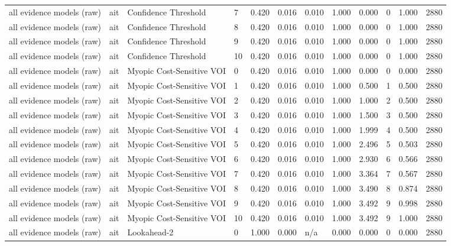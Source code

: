 \begin{table}[!ht]
{\begin{tabular}{llllllllllll}
all evidence models (raw) & ait & Confidence Threshold & 7 & 0.420 & 0.016 & 0.010 & 1.000 & 0.000 & 0 & 1.000 & 2880 \\
all evidence models (raw) & ait & Confidence Threshold & 8 & 0.420 & 0.016 & 0.010 & 1.000 & 0.000 & 0 & 1.000 & 2880 \\
all evidence models (raw) & ait & Confidence Threshold & 9 & 0.420 & 0.016 & 0.010 & 1.000 & 0.000 & 0 & 1.000 & 2880 \\
all evidence models (raw) & ait & Confidence Threshold & 10 & 0.420 & 0.016 & 0.010 & 1.000 & 0.000 & 0 & 1.000 & 2880 \\
all evidence models (raw) & ait & Myopic Cost-Sensitive VOI & 0 & 0.420 & 0.016 & 0.010 & 1.000 & 0.000 & 0 & 0.000 & 2880 \\
all evidence models (raw) & ait & Myopic Cost-Sensitive VOI & 1 & 0.420 & 0.016 & 0.010 & 1.000 & 0.500 & 1 & 0.500 & 2880 \\
all evidence models (raw) & ait & Myopic Cost-Sensitive VOI & 2 & 0.420 & 0.016 & 0.010 & 1.000 & 1.000 & 2 & 0.500 & 2880 \\
all evidence models (raw) & ait & Myopic Cost-Sensitive VOI & 3 & 0.420 & 0.016 & 0.010 & 1.000 & 1.500 & 3 & 0.500 & 2880 \\
all evidence models (raw) & ait & Myopic Cost-Sensitive VOI & 4 & 0.420 & 0.016 & 0.010 & 1.000 & 1.999 & 4 & 0.500 & 2880 \\
all evidence models (raw) & ait & Myopic Cost-Sensitive VOI & 5 & 0.420 & 0.016 & 0.010 & 1.000 & 2.496 & 5 & 0.503 & 2880 \\
all evidence models (raw) & ait & Myopic Cost-Sensitive VOI & 6 & 0.420 & 0.016 & 0.010 & 1.000 & 2.930 & 6 & 0.566 & 2880 \\
all evidence models (raw) & ait & Myopic Cost-Sensitive VOI & 7 & 0.420 & 0.016 & 0.010 & 1.000 & 3.364 & 7 & 0.567 & 2880 \\
all evidence models (raw) & ait & Myopic Cost-Sensitive VOI & 8 & 0.420 & 0.016 & 0.010 & 1.000 & 3.490 & 8 & 0.874 & 2880 \\
all evidence models (raw) & ait & Myopic Cost-Sensitive VOI & 9 & 0.420 & 0.016 & 0.010 & 1.000 & 3.492 & 9 & 0.998 & 2880 \\
all evidence models (raw) & ait & Myopic Cost-Sensitive VOI & 10 & 0.420 & 0.016 & 0.010 & 1.000 & 3.492 & 9 & 1.000 & 2880 \\
all evidence models (raw) & ait & Lookahead-2 & 0 & 1.000 & 0.000 & n/a & 0.000 & 0.000 & 0 & 0.000 & 2880 \\

\end{tabular}}
\end{table}
